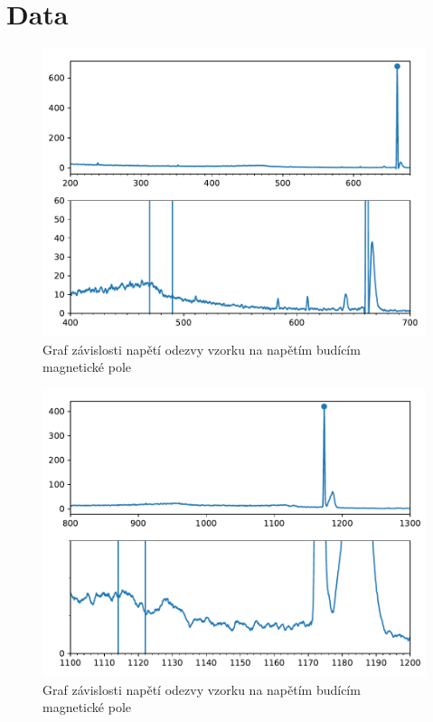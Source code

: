 \documentclass{article}
\begin{document}
\section{Data}
\begin{figure}[h]
  \hspace*{-1em}
  \includegraphics[scale=0.8]{figs/Cs137.pdf}
  \caption{Graf závislosti napětí odezvy vzorku na napětím budícím magnetické pole}
\end{figure}
\begin{figure}[h]
  \hspace*{-1em}
  \includegraphics[scale=0.8]{figs/Co60.pdf}
  \caption{Graf závislosti napětí odezvy vzorku na napětím budícím magnetické pole}
\end{figure}
\end{document}
